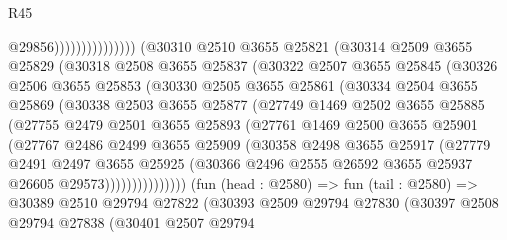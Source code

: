 \begin{lexlean}{R45}
\begin{coremodule}
                                      @29856)))))))))))))))
        (@30310
          @2510
          @3655
          @25821
          (@30314
            @2509
            @3655
            @25829
            (@30318
              @2508
              @3655
              @25837
              (@30322
                @2507
                @3655
                @25845
                (@30326
                  @2506
                  @3655
                  @25853
                  (@30330
                    @2505
                    @3655
                    @25861
                    (@30334
                      @2504
                      @3655
                      @25869
                      (@30338
                        @2503
                        @3655
                        @25877
                        (@27749
                          @1469
                          @2502
                          @3655
                          @25885
                          (@27755
                            @2479
                            @2501
                            @3655
                            @25893
                            (@27761
                              @1469
                              @2500
                              @3655
                              @25901
                              (@27767
                                @2486
                                @2499
                                @3655
                                @25909
                                (@30358
                                  @2498
                                  @3655
                                  @25917
                                  (@27779
                                    @2491
                                    @2497
                                    @3655
                                    @25925
                                    (@30366
                                      @2496
                                      @2555
                                      @26592
                                      @3655
                                      @25937
                                      @26605
                                      @29573)))))))))))))))
        (fun (head : @2580) =>
        fun (tail : @2580) =>
        @30389
          @2510
          @29794
          @27822
          (@30393
            @2509
            @29794
            @27830
            (@30397
              @2508
              @29794
              @27838
              (@30401
                @2507
                @29794

\end{coremodule}
\end{lexlean}
